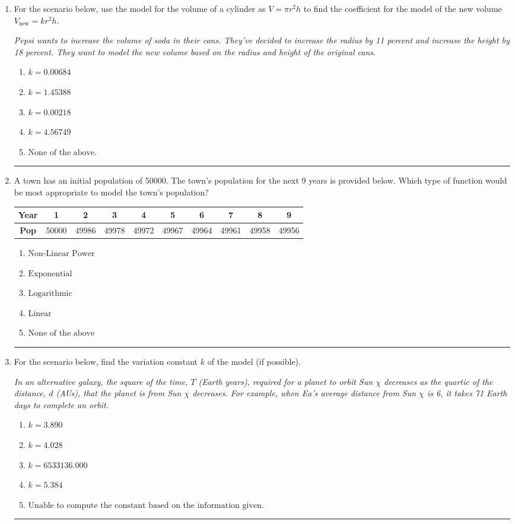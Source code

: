 \documentclass[14pt]{extbook}
\newcommand{\litem}[1]{\item#1\hspace*{-1cm}\rule{\textwidth}{0.4pt}}
\begin{document}
\begin{enumerate}
\litem{
For the scenario below, use the model for the volume of a cylinder as $V = \pi r^2 h$ to find the coefficient for the model of the new volume $V_{\text{new}} = k r^2 h$.
\begin{center}
    \textit{ Pepsi wants to increase the volume of soda in their cans. They've decided to increase the radius by 11 percent and increase the height by 18 percent. They want to model the new volume based on the radius and height of the original cans. }
\end{center}
\begin{enumerate}[label=\Alph*.]
\item \( k = 0.00684 \)
\item \( k = 1.45388 \)
\item \( k = 0.00218 \)
\item \( k = 4.56749 \)
\item \( \text{None of the above.} \)

\end{enumerate} }
\litem{
A town has an initial population of 50000. The town's population for the next 9 years is provided below. Which type of function would be most appropriate to model the town's population?

\begin{tabular}{c|c|c|c|c|c|c|c|c|c}
\textbf{Year} &1 &2 &3 &4 &5 &6 &7 &8 &9\tabularnewline \hline
\textbf{Pop} &50000 &49986 &49978 &49972 &49967 &49964 &49961 &49958 &49956\end{tabular}\begin{enumerate}[label=\Alph*.]
\item \( \text{Non-Linear Power} \)
\item \( \text{Exponential} \)
\item \( \text{Logarithmic} \)
\item \( \text{Linear} \)
\item \( \text{None of the above} \)

\end{enumerate} }
\litem{
For the scenario below, find the variation constant $k$ of the model (if possible).
\begin{center}
    \textit{ In an alternative galaxy, the square of the time, $T$ (Earth years), required for a planet to orbit Sun $\chi$ decreases as the quartic of the distance, $d$ (AUs), that the planet is from Sun $\chi$ decreases. For example, when Ea's average distance from Sun $\chi$ is 6, it takes 71 Earth days to complete an orbit. }
\end{center}
\begin{enumerate}[label=\Alph*.]
\item \( k = 3.890 \)
\item \( k = 4.028 \)
\item \( k = 6533136.000 \)
\item \( k = 5.384 \)
\item \( \text{Unable to compute the constant based on the information given.} \)


\end{enumerate}}
\end{enumerate}
\end{document}
